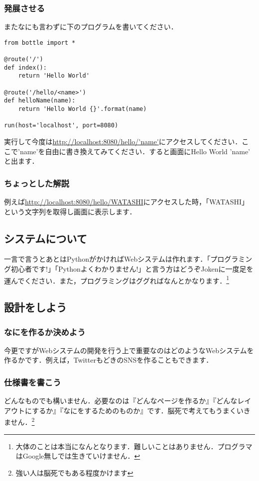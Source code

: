 \documentclass{jsarticle}
\begin{document}
\subsubsection{発展させる}
またなにも言わずに下のプログラムを書いてください．
\begin{lstlisting}[basicstyle=\ttfamily\footnotesize, frame=single]
from bottle import *  

@route('/')
def index():
	return 'Hello World'

@route('/hello/<name>')
def helloName(name):
	return 'Hello World {}'.format(name)

run(host='localhost', port=8080)
\end{lstlisting}
実行して今度は\url{http://localhost:8080/hello/'name'}にアクセスしてください．ここで'name'を自由に書き換えてみてください．すると画面にHello World 'name' と出ます．

\subsubsection{ちょっとした解説}
例えば\url{http://localhost:8080/hello/WATASHI}にアクセスした時，「WATASHI」という文字列を取得し画面に表示します．


\subsection{システムについて}
一言で言うとあとはPythonがかければWebシステムは作れます．「プログラミング初心者です!」「Pythonよくわかりません!」と言う方はどうぞJokenに一度足を運んでください．また，プログラミングはググればなんとかなります．\footnote{大体のことは本当になんとなります．難しいことはありません．プログラマはGoogle無しでは生きていけません．} 

\subsection{設計をしよう}
\subsubsection{なにを作るか決めよう}
今更ですがWebシステムの開発を行う上で重要なのはどのようなWebシステムを作るかです．例えば，TwitterもどきのSNSを作ることもできます．

\subsubsection{仕様書を書こう}
どんなものでも構いません．必要なのは『どんなページを作るか』『どんなレイアウトにするか』『なにをするためのものか』です．脳死で考えてもうまくいきません．\footnote{強い人は脳死でもある程度かけます}  
\end{document}
